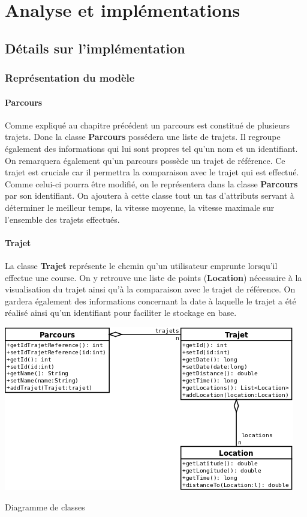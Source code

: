 \part{Analyse et implémentations}
\chapter{Détails sur l'implémentation}
\section{Représentation du modèle}
\subsection{Parcours}
Comme expliqué au chapitre précédent un parcours est constitué de plusieurs trajets. Donc la classe {\bfseries Parcours} possédera une liste de trajets. Il regroupe également des informations qui lui sont propres tel qu'un nom et un identifiant. On remarquera également qu'un parcours possède un trajet de référence. Ce trajet est cruciale car il permettra la comparaison avec le trajet qui est effectué. Comme celui-ci pourra être modifié, on le représentera dans la classe {\bfseries Parcours} par son identifiant. On ajoutera à cette classe tout un tas d'attributs servant à déterminer le meilleur temps, la vitesse moyenne, la vitesse maximale sur l'ensemble des trajets effectués.

\subsection{Trajet}
La classe {\bfseries Trajet} représente le chemin qu'un utilisateur emprunte lorsqu'il effectue une course. On y retrouve une liste de points ({\bfseries Location}) nécessaire à la visualisation du trajet ainsi qu'à la comparaison avec le trajet de référence. On gardera également des informations concernant la date à laquelle le trajet a été réalisé ainsi qu'un identifiant pour faciliter le stockage en base. 
\begin{img}
  \includegraphics{img/DiagrammeDeClasse.png}
  \caption{Diagramme de classes}
\end{img}